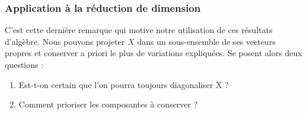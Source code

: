                \subsubsection*{Application à la réduction de dimension}
                    C’est cette dernière remarque qui motive notre utilisation de ces résultats d’algèbre. Nous pouvons projeter $X$ dans un sous-ensemble de ses vecteurs propres et conserver a priori le plus de variations expliquées. Se posent alors deux questions :

                    \begin{enumerate}
                        \item Est-t-on certain que l’on pourra toujours diagonaliser X ?
                        \item Comment prioriser les composantes à conserver ?
                    \end{enumerate}

